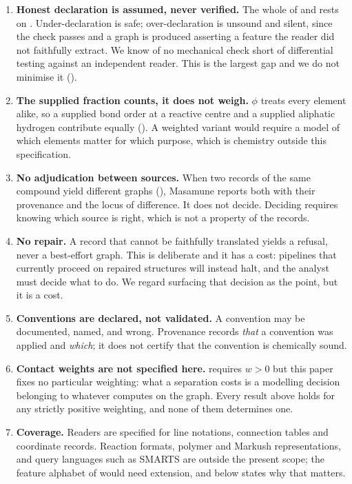 \documentclass[11pt,twocolumn,a4paper]{article}
\theoremstyle{msthm}
\theoremstyle{definition}
\theoremstyle{remark}
\newcommand{\wt}{w}
\begin{document}
\begin{enumerate}[label=\textbf{L\arabic*.},leftmargin=2.8em,itemsep=4pt]

\item \textbf{Honest declaration is assumed, never verified.} The whole
of  and  rests on
. Under-declaration is safe; over-declaration is
unsound and silent, since the check passes and a graph is produced
asserting a feature the reader did not faithfully extract. We know of no
mechanical check short of differential testing against an independent
reader. This is the largest gap and we do not minimise it
().

\item \textbf{The supplied fraction counts, it does not weigh.} $\phi$
treats every element alike, so a supplied bond order at a reactive
centre and a supplied aliphatic hydrogen contribute equally
(). A weighted variant would require a model
of which elements matter for which purpose, which is chemistry outside
this specification.

\item \textbf{No adjudication between sources.} When two records of the
same compound yield different graphs (), Masamune
reports both with their provenance and the locus of difference. It does
not decide. Deciding requires knowing which source is right, which is
not a property of the records.

\item \textbf{No repair.} A record that cannot be faithfully translated
yields a refusal, never a best-effort graph. This is deliberate and it
has a cost: pipelines that currently proceed on repaired structures will
instead halt, and the analyst must decide what to do. We regard
surfacing that decision as the point, but it is a cost.

\item \textbf{Conventions are declared, not validated.} A convention may
be documented, named, and wrong. Provenance records \emph{that} a
convention was applied and \emph{which}; it does not certify that the
convention is chemically sound.

\item \textbf{Contact weights are not specified here.} 
requires $\wt>0$ but this paper fixes no particular weighting: what a
separation costs is a modelling decision belonging to whatever computes
on the graph. Every result above holds for any strictly positive
weighting, and none of them determines one.

\item \textbf{Coverage.} Readers are specified for line notations,
connection tables and coordinate records. Reaction formats, polymer and
Markush representations, and query languages such as SMARTS
\citep{daylight_smarts} are outside the present scope; the feature
alphabet of  would need extension, and
 below states why that matters.
\end{enumerate}
\end{document}
